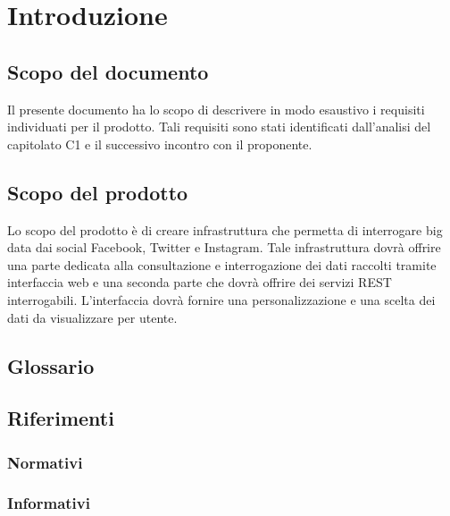 
\section{Introduzione}

\subsection{Scopo del documento}
Il presente documento ha lo scopo di descrivere in modo esaustivo i requisiti individuati per il prodotto. Tali requisiti sono stati identificati dall’analisi del capitolato C1 e il successivo incontro con il proponente.

\subsection{Scopo del prodotto}
Lo scopo del prodotto è di creare infrastruttura che permetta di interrogare big data dai social Facebook, Twitter e Instagram. Tale infrastruttura dovrà offrire una parte dedicata alla consultazione e interrogazione dei dati raccolti tramite interfaccia web e una seconda parte che dovrà offrire dei servizi REST interrogabili. L'interfaccia dovrà fornire una personalizzazione e una scelta dei dati da visualizzare per utente.

\subsection{Glossario}


\subsection{Riferimenti}


\subsubsection{Normativi}


\subsubsection{Informativi}
